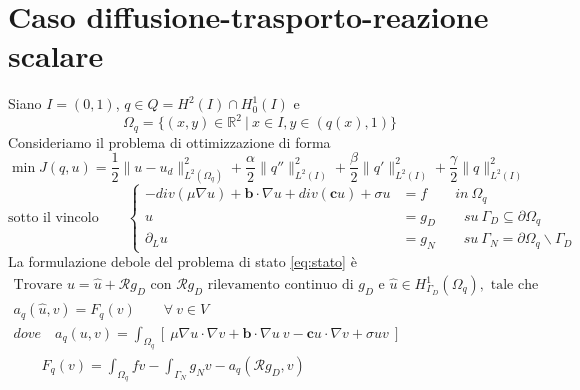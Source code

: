 \section{Caso diffusione-trasporto-reazione scalare}

Siano $I=(0,1)$, $q\in Q=H^2(I)\cap H^1_0(I)$ e
\begin{equation*}
 \Omega_q=\{(x,y)\in \mathds{R}^2\ |\ x\in I, y\in(q(x),1)\}
\end{equation*}
Consideriamo il problema di ottimizzazione di forma%
\begin{equation}
 \min J(q,u)=\frac{1}{2}\|u-u_d\|^2_{L^2(\Omega_q)}+\frac{\alpha}{2}\|q''\|^2_{L^2(I)}+\frac{\beta}{2}\|q'\|^2_{L^2(I)}+\frac{\gamma}{2}\|q\|^2_{L^2(I)}
 \label{eq:minJ}
\end{equation}
\begin{equation}
\text{sotto il vincolo}\qquad\left\{
\begin{aligned}
 -div \left(\mu \nabla u\right) + \mathbf{b}\cdot\nabla u + div (\mathbf{c}u)+\sigma u &= f \qquad in\ \Omega_q\\
u&=g_D\qquad su\ \Gamma_D \subseteq \partial\Omega_q\\
\partial_L u &= g_N\qquad su\ \Gamma_N=\partial\Omega_q \backslash \Gamma_D
\end{aligned}
\right.
\label{eq:stato}
\end{equation}
La formulazione debole del problema di stato \eqref{eq:stato} \`e
\begin{equation}
	\begin{aligned}
\text{Trovare } u = \hat{u}+\mathcal{R}g_D \text{ con } \mathcal{R}g_D \text{ rilevamento continuo di } g_D \text{ e } \hat{u}\in H^1_{\Gamma_D}(\Omega_q), \text{ tale che } \\
	 a_q(\hat{u},v)=F_q(v)\qquad\forall\ v\in V\\
	dove\quad a_q(u,v)=\int_{\Omega_q}{\left[\ \mu\nabla u\cdot\nabla v + \mathbf{b}\cdot\nabla u\ v-\mathbf{c} u \cdot\nabla v+\sigma u v\ \right]}\\
	\qquad F_q(v) = \int_{\Omega_q}{f v}-\int_{\Gamma_N} {g_N v}-a_q(\mathcal{R}g_D,v)
	\end{aligned}
\label{eq:statodeb}
\end{equation}

